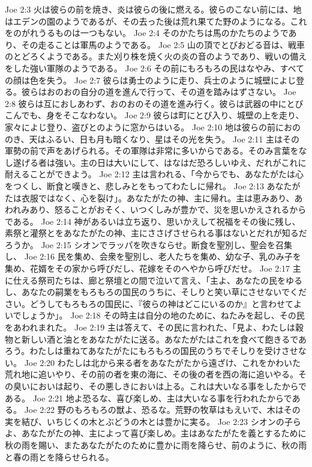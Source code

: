 Joe 2:3  火は彼らの前を焼き、炎は彼らの後に燃える。彼らのこない前には、地はエデンの園のようであるが、その去った後は荒れ果てた野のようになる。これをのがれうるものは一つもない。
Joe 2:4  そのかたちは馬のかたちのようであり、その走ることは軍馬のようである。
Joe 2:5  山の頂でとびおどる音は、戦車のとどろくようである。また刈り株を焼く火の炎の音のようであり、戦いの備えをした強い軍隊のようである。
Joe 2:6  その前にもろもろの民はなやみ、すべての顔は色を失う。
Joe 2:7  彼らは勇士のように走り、兵士のように城壁によじ登る。彼らはおのおの自分の道を進んで行って、その道を踏みはずさない。
Joe 2:8  彼らは互におしあわず、おのおのその道を進み行く。彼らは武器の中にとびこんでも、身をそこなわない。
Joe 2:9  彼らは町にとび入り、城壁の上を走り、家々によじ登り、盗びとのように窓からはいる。
Joe 2:10  地は彼らの前におののき、天はふるい、日も月も暗くなり、星はその光を失う。
Joe 2:11  主はその軍勢の前で声をあげられる。その軍隊は非常に多いからである。そのみ言葉をなし遂げる者は強い。主の日は大いにして、はなはだ恐ろしいゆえ、だれがこれに耐えることができよう。
Joe 2:12  主は言われる、「今からでも、あなたがたは心をつくし、断食と嘆きと、悲しみとをもってわたしに帰れ。
Joe 2:13  あなたがたは衣服ではなく、心を裂け」。あなたがたの神、主に帰れ。主は恵みあり、あわれみあり、怒ることがおそく、いつくしみが豊かで、災を思いかえされるからである。
Joe 2:14  神があるいは立ち返り、思いかえして祝福をその後に残し、素祭と灌祭とをあなたがたの神、主にささげさせられる事はないとだれが知るだろうか。
Joe 2:15  シオンでラッパを吹きならせ。断食を聖別し、聖会を召集し、
Joe 2:16  民を集め、会衆を聖別し、老人たちを集め、幼な子、乳のみ子を集め、花婿をその家から呼びだし、花嫁をそのへやから呼びだせ。
Joe 2:17  主に仕える祭司たちは、廊と祭壇との間で泣いて言え、「主よ、あなたの民をゆるし、あなたの嗣業をもろもろの国民のうちに、そしりと笑い草にさせないでください。どうしてもろもろの国民に、『彼らの神はどこにいるのか』と言わせてよいでしょうか」。
Joe 2:18  その時主は自分の地のために、ねたみを起し、その民をあわれまれた。
Joe 2:19  主は答えて、その民に言われた、「見よ、わたしは穀物と新しい酒と油とをあなたがたに送る。あなたがたはこれを食べて飽きるであろう。わたしは重ねてあなたがたにもろもろの国民のうちでそしりを受けさせない。
Joe 2:20  わたしは北から来る者をあなたがたから遠ざけ、これをかわいた荒れ地に追いやり、その前の者を東の海に、その後の者を西の海に追いやる。その臭いにおいは起り、その悪しきにおいは上る。これは大いなる事をしたからである。
Joe 2:21  地よ恐るな、喜び楽しめ、主は大いなる事を行われたからである。
Joe 2:22  野のもろもろの獣よ、恐るな。荒野の牧草はもえいで、木はその実を結び、いちじくの木とぶどうの木とは豊かに実る。
Joe 2:23  シオンの子らよ、あなたがたの神、主によって喜び楽しめ。主はあなたがたを義とするために秋の雨を賜い、またあなたがたのために豊かに雨を降らせ、前のように、秋の雨と春の雨とを降らせられる。
